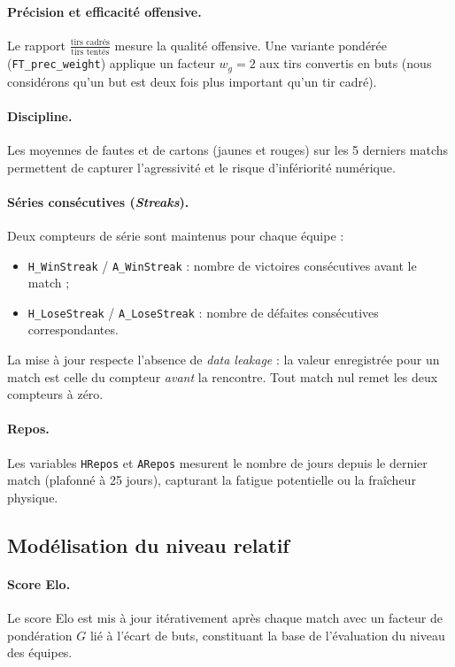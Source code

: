 \paragraph{Précision et efficacité offensive.}
Le rapport $\frac{\text{tirs cadrés}}{\text{tirs tentés}}$ mesure la qualité offensive. Une variante
pondérée (\texttt{FT\_prec\_weight}) applique un facteur $w_g = 2$ aux tirs
convertis en buts (nous considérons qu'un but est deux fois plus important qu'un 
tir cadré).

\paragraph{Discipline.}
Les moyennes de fautes et de cartons (jaunes et rouges) sur les 5 derniers matchs
permettent de capturer l'agressivité et le risque d'infériorité numérique.

\paragraph{Séries consécutives (\textit{Streaks}).}
Deux compteurs de série sont maintenus pour chaque équipe :
\begin{itemize}
    \item \texttt{H\_WinStreak} / \texttt{A\_WinStreak} : nombre de victoires consécutives avant le match ;
    \item \texttt{H\_LoseStreak} / \texttt{A\_LoseStreak} : nombre de défaites consécutives correspondantes.
\end{itemize}
La mise à jour respecte l'absence de \textit{data leakage} : la valeur enregistrée
pour un match est celle du compteur \textit{avant} la rencontre. Tout match nul
remet les deux compteurs à zéro.

\paragraph{Repos.}
Les variables \texttt{HRepos} et \texttt{ARepos} mesurent le nombre de jours depuis
le dernier match (plafonné à 25 jours), capturant la fatigue potentielle ou la fraîcheur physique.

\subsection{Modélisation du niveau relatif}

\paragraph{Score Elo.}
Le score Elo est mis à jour itérativement après chaque match avec un facteur de
pondération $G$ lié à l'écart de buts, constituant la base de l'évaluation du niveau des équipes.

